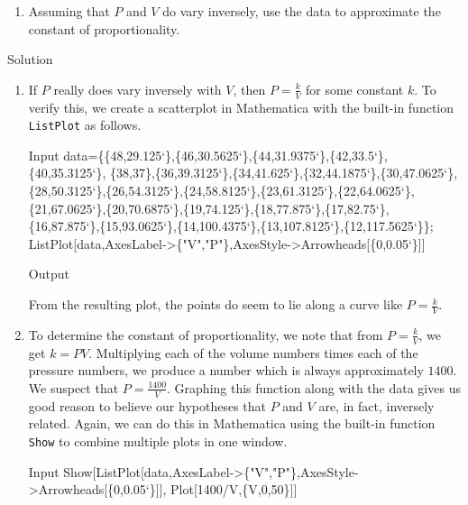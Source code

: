 \begin{example}
\begin{enumerate}
\item  Assuming that $P$ and $V$ do vary inversely, use the data to approximate the constant of proportionality.
\fi

\end{enumerate}


Solution 

\begin{enumerate}
\ifmathematica
\item If $P$ really does vary inversely with $V$, then $P = \frac{k}{V}$ for some constant $k$.  To verify this, we create a scatterplot in Mathematica with the built-in function \lstinline{ListPlot} as follows. 

\begin{mdframed}[default,backgroundcolor=gray!40,roundcorner=8pt]
\begin{mmaCell}[moredefined={data,Arrowheads}]{Input}
  data=\{\{48,29.125`\},\{46,30.5625`\},\{44,31.9375`\},\{42,33.5`\},\{40,35.3125`\},
		\{38,37\},\{36,39.3125`\},\{34,41.625`\},\{32,44.1875`\},\{30,47.0625`\},
		\{28,50.3125`\},\{26,54.3125`\},\{24,58.8125`\},\{23,61.3125`\},\{22,64.0625`\},
		\{21,67.0625`\},\{20,70.6875`\},\{19,74.125`\},\{18,77.875`\},\{17,82.75`\},
		\{16,87.875`\},\{15,93.0625`\},\{14,100.4375`\},\{13,107.8125`\},\{12,117.5625`\}\};
		ListPlot[data,AxesLabel->\{"V","P"\},AxesStyle->Arrowheads[\{0,0.05`\}]]
\end{mmaCell}


\begin{mmaCell}[moregraphics={moreig={scale=.4}}]{Output}
\end{mmaCell}
\end{mdframed}

From the resulting plot, the points do seem to lie along a curve like $P = \frac{k}{V}$.

\item  To determine the constant of proportionality, we note that from $P = \frac{k}{V}$, we get $k = PV$.  Multiplying each of the volume numbers times each of the pressure numbers, we produce a number which is always approximately $1400$.  We suspect that $P = \frac{1400}{V}$.  Graphing this function  along with the data gives us good reason to believe our hypotheses that $P$ and $V$ are, in fact, inversely related. Again, we can do this in Mathematica using the built-in function \lstinline{Show} to combine multiple plots in one window. 

\begin{mdframed}[default,backgroundcolor=gray!40,roundcorner=8pt]
\begin{mmaCell}[moredefined={data,Arrowheads},morefunctionlocal={V}]{Input}
  Show[ListPlot[data,AxesLabel->\{"V","P"\},AxesStyle->Arrowheads[\{0,0.05`\}]],
		Plot[1400/V,\{V,0,50\}]]
\end{mmaCell}



\end{mdframed}
\end{enumerate}
\end{example}

